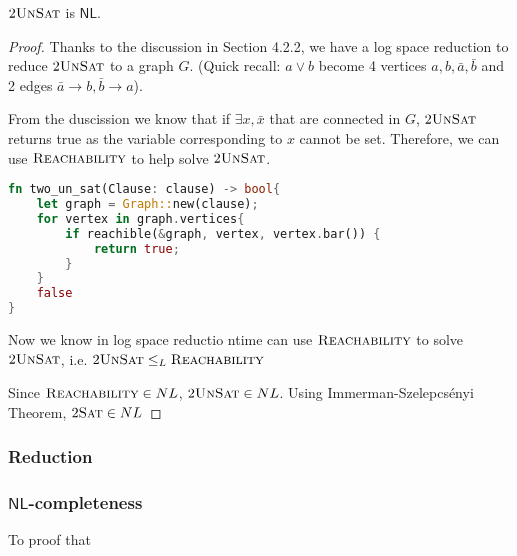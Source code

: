 \begin{theorem}
    $2\textsc{UnSat}$ is $\mathsf{NL}$.
\end{theorem}
\begin{proof}
    Thanks to the discussion in Section 4.2.2, we have a log space reduction to reduce $2\textsc{UnSat}$ to a graph $G$.
    (Quick recall: $a \vee b$ become 4 vertices $a, b, \bar{a}, \bar{b}$ and 2 edges $\bar{a} \rightarrow b, \bar{b} \rightarrow a$).

    From the duscission we know that if $\exists x, \bar{x}$ that are connected in $G$, $2\textsc{UnSat}$ returns true as the variable corresponding to $x$ cannot be set.
    Therefore, we can use $\textsc{Reachability}$ to help solve $2\textsc{UnSat}$.

    \begin{lstlisting}[language = Rust]
fn two_un_sat(Clause: clause) -> bool{
    let graph = Graph::new(clause);
    for vertex in graph.vertices{
        if reachible(&graph, vertex, vertex.bar()) {
            return true;
        }
    }
    false
}\end{lstlisting}

    Now we know in log space reductio ntime can use $\textsc{Reachability}$ to solve $2\textsc{UnSat}$, i.e. $2\textsc{UnSat} \le_L \textsc{Reachability}$

    Since $\textsc{Reachability} \in NL$, $2\textsc{UnSat} \in NL$.
    Using Immerman-Szelepcs\'{e}nyi Theorem, $2\textsc{Sat} \in NL$
\end{proof}

\subsubsection*{Reduction}

\subsubsection*{$\mathsf{NL}$-completeness}

To proof that

